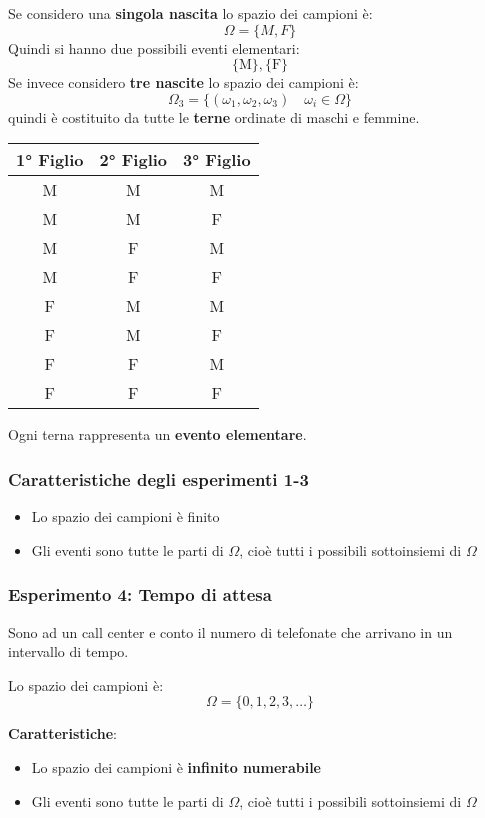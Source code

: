 \documentclass[a4paper]{article}
\theoremstyle{break}
\theoremstyle{break}
\theoremstyle{break}
\theoremstyle{break}
\begin{document}
Se considero una \textbf{singola nascita} lo spazio dei campioni è:
\[
	\Omega = \{M, F\}
\]
Quindi si hanno due possibili eventi elementari:
\[
	\{\text{M}\}, \{\text{F}\}
\]
Se invece considero \textbf{tre nascite} lo spazio dei campioni è:
\[
	\Omega_3 = \{(\omega_1, \omega_2, \omega_3) \quad \omega_i \in \Omega\}
\]
quindi è costituito da tutte le \textbf{terne} ordinate di maschi e femmine.
\begin{table}[H]
	\centering
	\begin{tabular}{|c|c|c|}
		\hline
		1° Figlio & 2° Figlio & 3° Figlio \\
		\hline
		M         & M         & M         \\
		M         & M         & F         \\
		M         & F         & M         \\
		M         & F         & F         \\
		F         & M         & M         \\
		F         & M         & F         \\
		F         & F         & M         \\
		F         & F         & F         \\
		\hline
	\end{tabular}
\end{table}
\noindent Ogni terna rappresenta un \textbf{evento elementare}.

\subsubsection{Caratteristiche degli esperimenti 1-3}
\begin{itemize}
	\item Lo spazio dei campioni è finito
	\item Gli eventi sono tutte le parti di \( \Omega \), cioè tutti i possibili sottoinsiemi
	      di \( \Omega \)
\end{itemize}

\subsubsection{Esperimento 4: Tempo di attesa}
Sono ad un call center e conto il numero di telefonate che arrivano in un intervallo di tempo.

\noindent Lo spazio dei campioni è:
\[
	\Omega = \{0, 1, 2, 3, \ldots\}
\]

\textbf{Caratteristiche}:
\begin{itemize}
	\item Lo spazio dei campioni è \textbf{infinito numerabile}
	\item Gli eventi sono tutte le parti di \( \Omega \), cioè tutti i possibili sottoinsiemi
	      di \( \Omega \)
\end{itemize}
\end{document}
